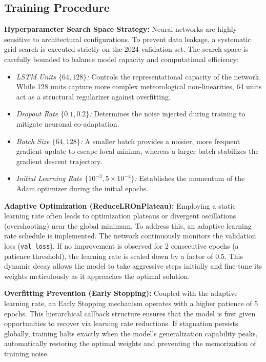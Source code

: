\documentclass[12pt,a4paper,oneside]{report}
\begin{document}
\subsection{Training Procedure}
\textbf{Hyperparameter Search Space Strategy:}
Neural networks are highly sensitive to architectural configurations. To prevent data leakage, a systematic grid search is executed strictly on the 2024 validation set. The search space is carefully bounded to balance model capacity and computational efficiency:
\begin{itemize}
    \item \textit{LSTM Units $\{64, 128\}$:} Controls the representational capacity of the network. While 128 units capture more complex meteorological non-linearities, 64 units act as a structural regularizer against overfitting.
    \item \textit{Dropout Rate $\{0.1, 0.2\}$:} Determines the noise injected during training to mitigate neuronal co-adaptation.
    \item \textit{Batch Size $\{64, 128\}$:} A smaller batch provides a noisier, more frequent gradient update to escape local minima, whereas a larger batch stabilizes the gradient descent trajectory.
    \item \textit{Initial Learning Rate $\{10^{-3}, 5 \times 10^{-4}\}$:} Establishes the momentum of the Adam optimizer during the initial epochs.
\end{itemize}

\textbf{Adaptive Optimization (ReduceLROnPlateau):}
Employing a static learning rate often leads to optimization plateaus or divergent oscillations (overshooting) near the global minimum. To address this, an adaptive learning rate schedule is implemented. The network continuously monitors the validation loss (\texttt{val\_loss}). If no improvement is observed for 2 consecutive epochs (a patience threshold), the learning rate is scaled down by a factor of 0.5. This dynamic decay allows the model to take aggressive steps initially and fine-tune its weights meticulously as it approaches the optimal solution.

\textbf{Overfitting Prevention (Early Stopping):}
Coupled with the adaptive learning rate, an Early Stopping mechanism operates with a higher patience of 5 epochs. This hierarchical callback structure ensures that the model is first given opportunities to recover via learning rate reductions. If stagnation persists globally, training halts exactly when the model's generalization capability peaks, automatically restoring the optimal weights and preventing the memorization of training noise.
\end{document}
